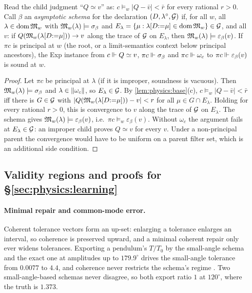 \begin{lemma}\label{lem:physics:asymptotic}
Read the child judgment ``$Q\simeq v$'' as: $c\models_w|Q-\bar v|<\bar r$ for every rational
$r>0$. Call $\beta$ an \emph{asymptotic schema} for the declaration $(D,\lambda^\circ,\mathcal{G})$ if,
for all $w$, all $\lambda\in\operatorname{dom}\mathfrak{M}_w$ with $\mathfrak{M}_w(\lambda)\models\sigma_\beta$ and
$E_\lambda=\{\mu:\lambda[D{:=}\mu]\in\operatorname{dom}\mathfrak{M}_w\}\in\mathcal{G}$, and all $v$: if
$Q(\mathfrak{M}_w(\lambda[D{:=}\mu]))\to v$ along the trace of $\mathcal{G}$ on $E_\lambda$, then
$\mathfrak{M}_w(\lambda)\models\varepsilon_\beta(v)$. If $\pi c$ is principal at $w$ (the root, or a
limit-semantics context below principal ancestors), the Exp instance from $c\Vdash Q\simeq v$,
$\pi c\Vdash\sigma_\beta$ and $\pi c\Vdash\omega_c$ to $\pi c\Vdash\varepsilon_\beta(v)$ is sound
at $w$.
\end{lemma}
\begin{proof}
Let $\pi c$ be principal at $\lambda$ (if it is improper, soundness is vacuous). Then
$\mathfrak{M}_w(\lambda)\models\sigma_\beta$ and $\lambda\in\lVert \omega_c\rVert$, so $E_\lambda\in\mathcal{G}$. By
\cref{lem:physics:base}(c), $c\models_w|Q-\bar v|<\bar r$ iff there is $G\in\mathcal{G}$ with
$|Q(\mathfrak{M}_w(\lambda[D{:=}\mu]))-v|<r$ for all $\mu\in G\cap E_\lambda$. Holding for every
rational $r>0$, this is convergence to $v$ along the trace of $\mathcal{G}$ on $E_\lambda$. The
schema gives $\mathfrak{M}_w(\lambda)\models\varepsilon_\beta(v)$, i.e.\ $\pi c\models_w\varepsilon_\beta(v)$.
Without $\omega_c$ the argument fails at $E_\lambda\in\mathcal{G}$: an improper child proves $Q\simeq v$
for every $v$. Under a non-principal parent the convergence would have to be uniform on a
parent filter set, which is an additional side condition.
\end{proof}

\subsection{Validity regions and proofs for \S\ref{sec:physics:learning}}\label{app:physics:regions}

\paragraph{Minimal repair and common-mode error.} Coherent tolerance vectors form an
up-set: enlarging a tolerance enlarges an interval, so coherence is preserved upward, and a
minimal coherent repair only ever widens tolerances. Exporting a pendulum's $T/T_0$ by the
small-angle schema and the exact one at amplitudes up to $179.9^\circ$ drives the
small-angle tolerance from $0.0077$ to $4.4$, and coherence never restricts the schema's
regime . Two small-angle-based schemas never disagree, so both export
ratio $1$ at $120^\circ$, where the truth is $1.373$.

